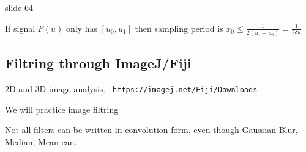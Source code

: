 \documentclass[../main/main.tex]{subfiles}
\begin{document}
slide 64

If signal $F(u)$ only has $[u_{0}, u_{1}]$  then sampling period is $x_{0}\leq \frac 1 {2 (u_{1}-u_{0})}= \frac 1 {2 \delta u}$


\subsection{Filtring through ImageJ/Fiji}

2D and 3D image analysis. \verb| https://imagej.net/Fiji/Downloads|

We will practice image filtring

Not all filters can be written in convolution form, even though Gaussian Blur, Median, Mean can.
\end{document}
